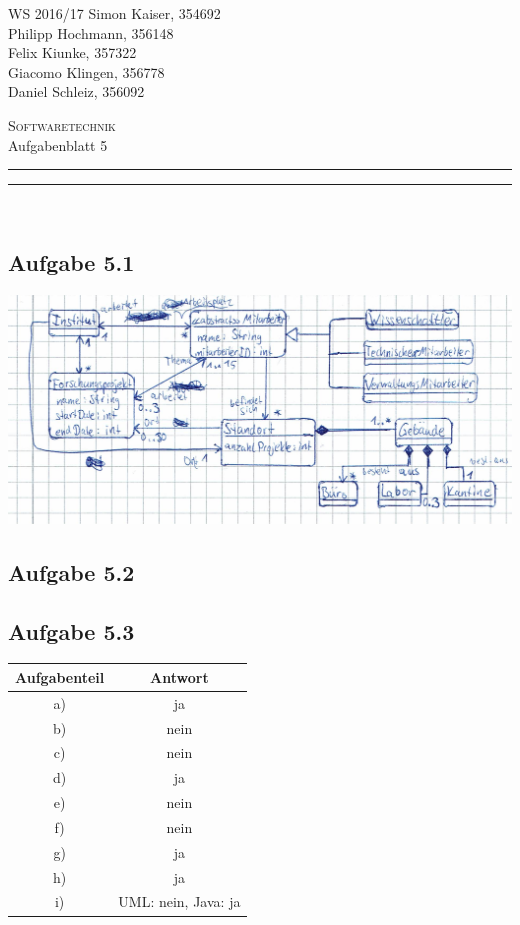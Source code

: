\documentclass[a4paper,graphics,11pt]{article}
\newcommand\aufgabe[1]{\subsection*{Aufgabe #1}}
\newcommand\aufgabenteil[1]{\subsubsection*{#1}}
\begin{document}
\noindent WS 2016/17        \hfill Simon Kaiser, 354692 \\
\null                                     \hfill Philipp Hochmann, 356148 \\
\null                                     \hfill Felix Kiunke, 357322 \\
\null                                     \hfill Giacomo Klingen, 356778 \\
\null                                     \hfill Daniel Schleiz, 356092 \\

\begin{center}
\Large \textsc{Softwaretechnik} \\   %
\large Aufgabenblatt 5                        %
\end{center}
\begin{center}
\rule[0.5ex]{\textwidth}{0.6pt}\vspace*{-\baselineskip}\vspace{3.2pt}
\rule[0.5ex]{\textwidth}{1.6pt}\\
\end{center}


%
% 

\aufgabe{5.1}
\begin{center}
	\includegraphics[scale=0.8]{51_TODO.jpg}
\end{center}

\aufgabe{5.2}

\begin{figure}[H]
  \centering
  
\end{figure}

\aufgabe{5.3}

\begin{table}[h]
\centering
\begin{tabular}{c|c}
Aufgabenteil & Antwort \\ \hline
a) & ja   \\
b) & nein \\
c) & nein \\
d) & ja   \\
e) & nein \\
f) & nein \\
g) & ja   \\
h) & ja   \\
i) & UML: nein, Java: ja
\end{tabular}
\end{table}
\end{document}
